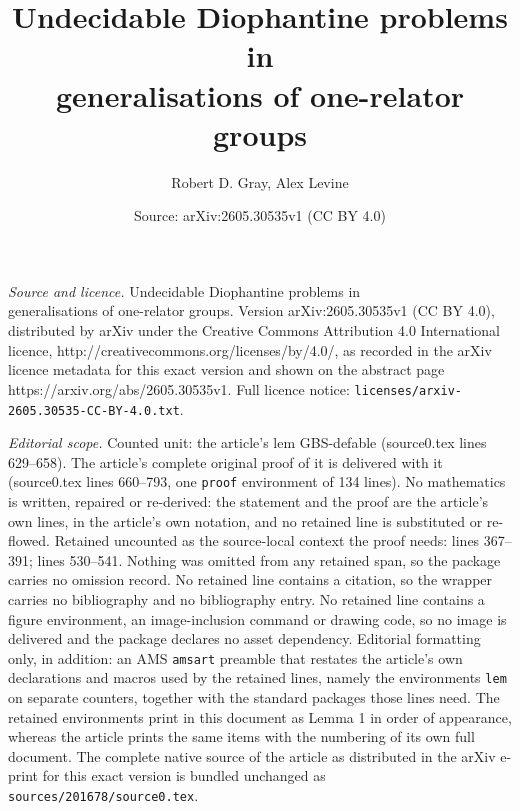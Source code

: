 \documentclass[10pt,a4paper]{amsart}
\title{Undecidable Diophantine problems in \\ generalisations of one-relator groups}
\author{Robert D. Gray, Alex Levine}
\date{Source: arXiv:2605.30535v1 (CC BY 4.0)}
\begin{document}
\maketitle

\noindent\emph{Source and licence.} Undecidable Diophantine problems in \\ generalisations of one-relator groups. Version arXiv:2605.30535v1 (CC BY 4.0), distributed by arXiv under the Creative Commons Attribution 4.0 International licence, http://creativecommons.org/licenses/by/4.0/, as recorded in the arXiv licence metadata for this exact version and shown on the abstract page https://arxiv.org/abs/2605.30535v1. Full licence notice: \texttt{licenses/arxiv-2605.30535-CC-BY-4.0.txt}.\par\smallskip

\noindent\textit{Editorial scope.} Counted unit: the article's lem GBS-defable (source0.tex lines 629--658). The article's complete original proof of it is delivered with it (source0.tex lines 660--793, one \texttt{proof} environment of 134 lines). No mathematics is written, repaired or re-derived: the statement and the proof are the article's own lines, in the article's own notation, and no retained line is substituted or re-flowed.  Retained uncounted as the source-local context the proof needs: lines 367--391; lines 530--541.  Nothing was omitted from any retained span, so the package carries no omission record.  No retained line contains a citation, so the wrapper carries no bibliography and no bibliography entry.  No retained line contains a figure environment, an image-inclusion command or drawing code, so no image is delivered and the package declares no asset dependency.  Editorial formatting only, in addition: an AMS \texttt{amsart} preamble that restates the article's own declarations and macros used by the retained lines, namely the environments \texttt{lem} on separate counters, together with the standard packages those lines need.  The retained environments print in this document as Lemma 1 in order of appearance, whereas the article prints the same items with the numbering of its own full document.  The complete native source of the article as distributed in the arXiv e-print for this exact version is bundled unchanged as \texttt{sources/201678/source0.tex}.
\end{document}
